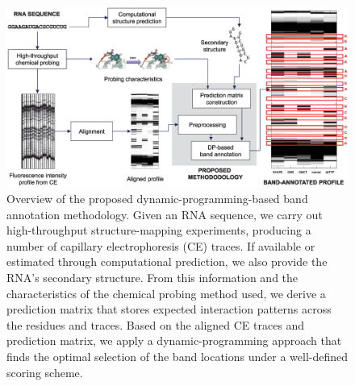 \begin{figure}
\centering
\includegraphics[width=\linewidth]{figures/intro_overview2}
\caption{Overview of the proposed dynamic-programming-based band annotation methodology. Given an RNA sequence, we carry out high-throughput structure-mapping experiments, producing a number of capillary electrophoresis (CE) traces. If available or estimated through computational prediction, we also provide the RNA's secondary structure. From this information and the characteristics of the chemical probing method used, we derive a prediction matrix that stores expected interaction patterns across the residues and traces. Based on the aligned CE traces and prediction matrix, we apply a dynamic-programming approach that finds the optimal selection of the band locations under a well-defined scoring scheme.}
\label{f:overview}
\end{figure}


